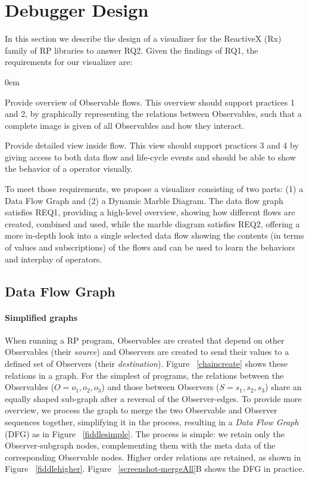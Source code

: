 \section{Debugger Design}%
\label{section-design} In this section we describe the design of a
visualizer for the ReactiveX (Rx) family of RP libraries to answer RQ2.
Given the findings of RQ1, the requirements for our visualizer are:
\begin{description}
        \itemsep0em
    \item[REQ1]
        Provide overview of Observable flows.  This overview should
        support practices 1 and 2, by graphically representing the
        relations between Observables, such that a complete image is
        given of all Observables and how they interact.
    \item[REQ2]
        Provide detailed view inside flow.  This view should support
        practices 3 and 4 by giving access to both data flow and
        life-cycle events and should be able to show the behavior of a
        operator visually.
\end{description}

To meet those requirements, we propose a visualizer consisting of two
parts:  (1) a Data Flow Graph and (2) a Dynamic Marble Diagram.  The
data flow graph satisfies REQ1, providing a high-level overview, showing
how different flows are created, combined and used, while the marble
diagram satisfies REQ2, offering a more in-depth look into a single
selected data flow showing the contents (in terms of values and
subscriptions) of the flows and can be used to learn the behaviors and
interplay of operators.

\subsection{Data Flow Graph}
\paragraph{Simplified graphs} When running a RP program, Observables
are created that depend on other Observables (their \emph{source}) and
Observers are created to send their values to a defined set of Observers
(their \emph{destination}).  Figure~%
\ref{chaincreate} shows these relations in a graph.  For the simplest of
programs, the relations between the Observables ($ O = {o_1, o_2, o_3} $)
and those between Observers ($ S = {s_1, s_2, s_3} $) share an equally
shaped sub-graph after a reversal of the Observer-edges.  To provide
more overview, we process the graph to merge the two Observable and
Observer sequences together, simplifying it in the process, resulting in
a \emph{Data Flow Graph} (DFG) as in Figure~%
\ref{fiddlesimple}.  The process is simple:  we retain only the
Observer-subgraph nodes, complementing them with the meta data of the
corresponding Observable nodes.  Higher order relations are retained, as
shown in Figure~%
\ref{fiddlehigher}.  Figure~%
\ref{screenshot-mergeAll}B shows the DFG in practice.

